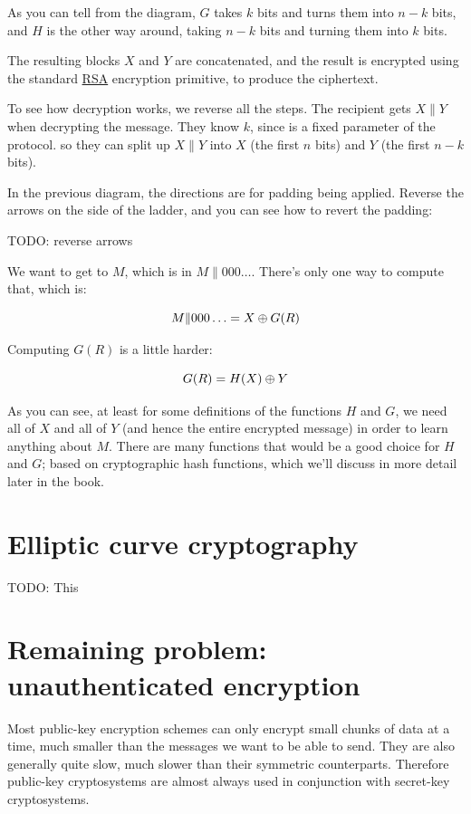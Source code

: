 \documentclass[11pt,ebook,table,dvipsnames]{memoir}
\begin{document}
As you can tell from the diagram, $G$ takes $k$ bits and turns them
into $n - k$ bits, and $H$ is the other way around, taking $n - k$
bits and turning them into $k$ bits.

The resulting blocks $X$ and $Y$ are concatenated, and the result is
encrypted using the standard \hyperref[RSA]{RSA} encryption primitive, to produce the
ciphertext.

To see how decryption works, we reverse all the steps. The recipient
gets $X \| Y$ when decrypting the message. They know $k$, since is a
fixed parameter of the protocol. so they can split up $X \| Y$ into
$X$ (the first $n$ bits) and $Y$ (the first $n - k$ bits).

In the previous diagram, the directions are for padding being applied.
Reverse the arrows on the side of the ladder, and you can see how to
revert the padding:

TODO: reverse arrows

We want to get to $M$, which is in $M \| 000\ldots$. There's only one
way to compute that, which is:

\[
M \| 000\ldots = X \oplus G(R)
\]

Computing $G(R)$ is a little harder:

\[
G(R) = H(X) \oplus Y
\]

As you can see, at least for some definitions of the functions $H$ and
$G$, we need all of $X$ and all of $Y$ (and hence the entire encrypted
message) in order to learn anything about $M$. There are many
functions that would be a good choice for $H$ and $G$; based on
cryptographic hash functions, which we'll discuss in more detail later
in the book.
\section{Elliptic curve cryptography}
\label{sec-2-5-4}

TODO: This
\section{Remaining problem: unauthenticated encryption}
\label{sec-2-5-5}

Most \gls{public-key encryption} schemes can only encrypt small chunks
of data at a time, much smaller than the messages we want to be able
to send. They are also generally quite slow, much slower than their
symmetric counterparts. Therefore public-key cryptosystems are almost
always used in conjunction with secret-key cryptosystems.
\end{document}
